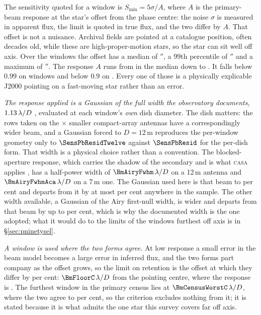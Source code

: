 The sensitivity quoted for a window is $S_{\min}=5\sigma/A$, where $A$ is the
primary-beam response at the star's offset from the phase centre: the noise
$\sigma$ is measured in apparent flux, the limit is quoted in true flux, and
the two differ by $A$. That offset is not a nuisance. Archival fields are
pointed at a catalogue position, often decades old, while these are
high-proper-motion stars, so the star can sit well off axis. Over the
\PbNWin{} windows the offset has a median of \PbOffMed$''$, a 99th
percentile of \PbOffPNN$''$ and a maximum of \BmOffMax$''$. The response $A$
runs from \BmRespMed{} in the median down to \BmRespMin. It falls below $0.99$
on \PbNLowNN{} windows and below $0.9$ on \BmNBelowNine. Every one
of those is a physically explicable J2000 pointing on a
fast-moving star rather than an error.

\emph{The response applied is a Gaussian of the full width the observatory
documents}, $1.13\,\lambda/D$ \citep{ALMAHandbook}, evaluated at each
window's \emph{own} dish diameter. The dish matters: the \PbNAcaRow{} rows
taken on the \PbAcaRatio$\times$ smaller compact-array antennas have a
correspondingly wider beam, and a Gaussian forced to $D=12$\,m reproduces the
per-window geometry only to $\SensPbResidTwelve$ against $\SensPbResid$ for
the per-dish form. That width is a physical choice rather than a convention.
The blocked-aperture response, which carries the shadow of the secondary and
is what \textsc{casa} applies \citep{CASA2022}, has a half-power
width of $\BmAiryFwhm\,\lambda/D$ on a 12\,m antenna and
$\BmAiryFwhmAca\,\lambda/D$ on a 7\,m one. The Gaussian used here is that
beam to \BmDocAiryPct{} per cent and departs from it by at most
\BmModelMaxPct{} per cent anywhere in the sample. The other width available,
a Gaussian of the Airy first-null width, is wider and departs from that beam
by up to \BmModelMaxNullPct{} per cent, which is why the documented width is
the one adopted; what it would do to the limits of the windows furthest off
axis is in \S\ref{sec:pninetysel}.

\emph{A window is used where the two forms agree.} At low response a small
error in the beam model becomes a large error in inferred flux, and the two
forms part company as the offset grows, so the limit on retention is the
offset at which they differ by \BmFloorTolPct{} per cent:
$\BmFloorC\,\lambda/D$ from the pointing centre, where the response is
\BmFloorResp. The furthest window in the primary census lies at
$\BmCensusWorstC\,\lambda/D$, where the two agree to \BmCensusWorstPct{} per
cent, so the criterion excludes nothing from it; it is stated because it is
what admits the one star this survey covers far off axis.

